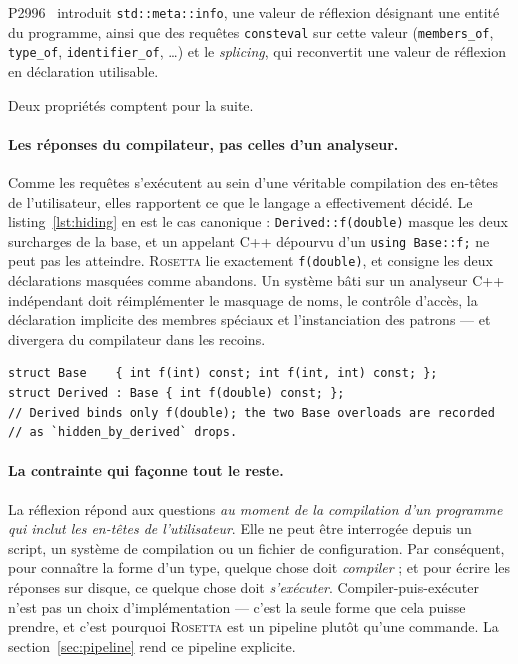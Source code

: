 \documentclass[11pt,a4paper]{article}
\newcommand{\rosetta}{\textsc{Rosetta}}
\newcommand{\code}[1]{\texttt{\small #1}}
\begin{document}
P2996~\cite{p2996} introduit \code{std::meta::info}, une valeur de réflexion
désignant une entité du programme, ainsi que des requêtes \code{consteval} sur
cette valeur (\code{members\_of}, \code{type\_of}, \code{identifier\_of},
\dots) et le \emph{splicing}, qui reconvertit une valeur de réflexion en
déclaration utilisable.

Deux propriétés comptent pour la suite.

\paragraph{Les réponses du compilateur, pas celles d'un analyseur.}
Comme les requêtes s'exécutent au sein d'une véritable compilation des en-têtes
de l'utilisateur, elles rapportent ce que le langage a effectivement décidé. Le
listing~\ref{lst:hiding} en est le cas canonique : \code{Derived::f(double)}
masque les deux surcharges de la base, et un appelant C++ dépourvu d'un
\code{using Base::f;} ne peut pas les atteindre. \rosetta{} lie exactement
\code{f(double)}, et consigne les deux déclarations masquées comme abandons. Un
système bâti sur un analyseur C++ indépendant doit réimplémenter le masquage de
noms, le contrôle d'accès, la déclaration implicite des membres spéciaux et
l'instanciation des patrons --- et divergera du compilateur dans les recoins.

\begin{lstlisting}[caption={Le masquage de noms est une décision du compilateur, pas une affaire de syntaxe.},label={lst:hiding}]
struct Base    { int f(int) const; int f(int, int) const; };
struct Derived : Base { int f(double) const; };
// Derived binds only f(double); the two Base overloads are recorded
// as `hidden_by_derived` drops.
\end{lstlisting}

\paragraph{La contrainte qui façonne tout le reste.}
La réflexion répond aux questions \emph{au moment de la compilation d'un
programme qui inclut les en-têtes de l'utilisateur}. Elle ne peut être
interrogée depuis un script, un système de compilation ou un fichier de
configuration. Par conséquent, pour connaître la forme d'un type, quelque chose
doit \emph{compiler} ; et pour écrire les réponses sur disque, ce quelque chose
doit \emph{s'exécuter}. Compiler-puis-exécuter n'est pas un choix
d'implémentation --- c'est la seule forme que cela puisse prendre, et c'est
pourquoi \rosetta{} est un pipeline plutôt qu'une commande. La
section~\ref{sec:pipeline} rend ce pipeline explicite.
\end{document}
